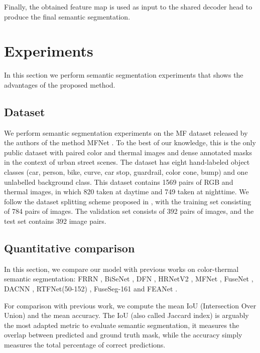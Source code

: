 \documentclass[10pt,twocolumn,letterpaper]{article}
\begin{document}
Finally, the obtained feature map  is used as input to the shared decoder head to produce the final semantic segmentation.

\section{Experiments}

In this section we perform semantic segmentation experiments that shows the advantages of the proposed method.

\subsection{Dataset}

We perform semantic segmentation experiments on the MF dataset released by the authors of the method MFNet \cite{Ha2017}. To the best of our knowledge, this is the only public dataset with paired color and thermal images and dense annotated masks in the context of urban street scenes. The dataset has eight hand-labeled object classes (car, person, bike, curve, car stop, guardrail, color cone, bump) and one unlabelled background class. This dataset contains 1569 pairs of RGB and thermal images, in which 820 taken at daytime and 749 taken at nighttime. We follow the dataset splitting scheme proposed in \cite{Ha2017}, with the training set consisting of 784 pairs of images. The validation set consists of 392 pairs of images, and the test set contains 392 image pairs.

\subsection{Quantitative comparison}

In this section, we compare our model with previous works on color-thermal semantic segmentation: FRRN \cite{DBLP:journals/corr/PohlenHML16}, BiSeNet \cite{DBLP:journals/corr/abs-1808-00897}, DFN \cite{DBLP:journals/corr/abs-1804-09337}, HRNetV2 \cite{DBLP:journals/corr/abs-1904-04514}, MFNet \cite{Ha2017}, FuseNet \cite{DBLP:conf/accv/HazirbasMDC16}, DACNN \cite{DBLP:journals/corr/abs-1803-06791}, RTFNet(50-152) \cite{Sun2019}, FuseSeg-161 \cite{FuseSeg} and FEANet \cite{DBLP:journals/corr/abs-2110-08988}.

For comparison with previous work, we compute the mean IoU (Intersection Over Union) and the mean accuracy.  
The IoU (also called Jaccard index) is arguably the most adapted metric to evaluate semantic segmentation, it measures the overlap between predicted and ground truth mask, while the accuracy simply measures the total percentage of correct predictions.
\end{document}
